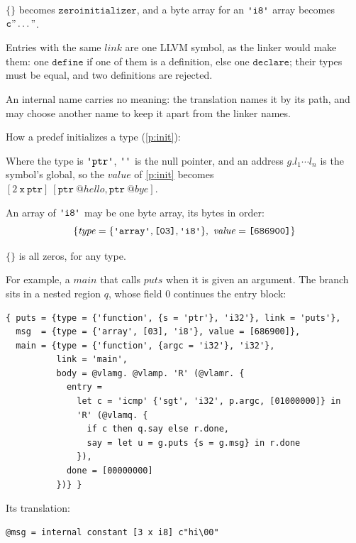 \documentclass[11pt,letterpaper]{article}
\newcommand{\kw}[1]{\mathtt{#1}}
\newcommand{\str}[1]{\text{\ttfamily\textquotesingle #1\textquotesingle}}  %
\newcommand{\hex}[1]{\text{\ttfamily [#1]}}  %
\newcounter{pt}
\newcommand{\pref}[1]{\ref{#1}}  %
\begin{document}
\begin{points}
\begin{subpoints}
  \item $\{\}$ becomes $\kw{zeroinitializer}$, and a byte array for an $\str{i8}$ array becomes $\kw{c"\dots"}$.
  \item Entries with the same $\mathit{link}$ are one LLVM symbol, as the linker would make them: one
    $\kw{define}$ if one of them is a definition, else one $\kw{declare}$; their types must be equal, and two
    definitions are rejected.
  \item An internal name carries no meaning: the translation names it by its path, and may choose another
    name to keep it apart from the linker names.
  \end{subpoints}
\item\label{p:init-llvm} How a predef initializes a type (\pref{p:init}):
  \begin{subpoints}
  \item Where the type is $\str{ptr}$, $\str{}$ is the null pointer, and an address $g.l_1 \cdots l_n$ is the symbol's global, so the
    $\mathit{value}$ of \pref{p:init} becomes $[2\ \kw{x}\ \kw{ptr}]\ [\kw{ptr}\ @\mathit{hello}, \kw{ptr}\ @\mathit{bye}]$.
  \item An array of $\str{i8}$ may be one byte array, its bytes in order:
    \[\{\mathit{type} = \{\str{array}, \hex{03}, \str{i8}\},\ \mathit{value} = \hex{686900}\}\]
  \item $\{\}$ is all zeros, for any type.
  \end{subpoints}
\item\label{p:example} For example, a $\mathit{main}$ that calls $\mathit{puts}$ when it is given an argument. The branch
  sits in a nested region $q$, whose field $0$ continues the entry block:
  \begin{Verbatim}[commandchars=\@\<\>, xleftmargin=2em]
{ puts = {type = {'function', {s = 'ptr'}, 'i32'}, link = 'puts'},
  msg  = {type = {'array', [03], 'i8'}, value = [686900]},
  main = {type = {'function', {argc = 'i32'}, 'i32'},
          link = 'main',
          body = @vlamg. @vlamp. 'R' (@vlamr. {
            entry =
              let c = 'icmp' {'sgt', 'i32', p.argc, [01000000]} in
              'R' (@vlamq. {
                if c then q.say else r.done,
                say = let u = g.puts {s = g.msg} in r.done
              }),
            done = [00000000]
          })} }
\end{Verbatim}
  Its translation:
  \begin{Verbatim}[xleftmargin=2em]
@msg = internal constant [3 x i8] c"hi\00"


\end{Verbatim}
\end{points}
\end{document}
